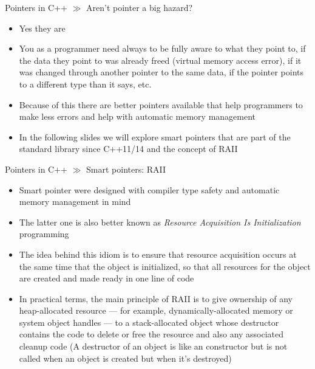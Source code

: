 \documentclass[10pt]{beamer}
\begin{document}
\begin{frame}{Pointers in C++ $\gg$ Aren't pointer a big hazard?}
\begin{itemize}
	\item Yes they are
	\item You as a programmer need always to be fully aware to what they point to, if the data they point to was already freed (virtual memory access error), if it was changed through another pointer to the same data, if the pointer points to a different type than it says, etc.
	\item Because of this there are better pointers available that help programmers to make less errors and help with automatic memory management
	\item In the following slides we will explore smart pointers that are part of the standard library since C++11/14 and the concept of RAII
\end{itemize}
\end{frame}

\begin{frame}{Pointers in C++ $\gg$ Smart pointers: RAII}
\begin{itemize}
	\item Smart pointer were designed with compiler type safety and automatic memory management in mind
	\item The latter one is also better known as \textit{Resource Acquisition Is Initialization} programming
	\item The idea behind this idiom is to ensure that resource acquisition occurs at the same time that the object is initialized, so that all resources for the object are created and made ready in one line of code
	\item In practical terms, the main principle of RAII is to give ownership of any heap-allocated resource — for example, dynamically-allocated memory or system object handles — to a stack-allocated object whose destructor contains the code to delete or free the resource and also any associated cleanup code (A destructor of an object is like an constructor but is not called when an object is created but when it's destroyed)
\end{itemize}
\end{frame}
\end{document}
